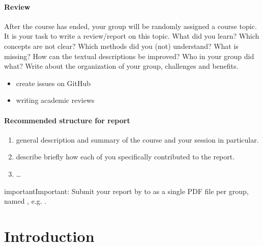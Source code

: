 \documentclass[letterpaper,10pt,english]{sphinxmanual}
\begin{document}
\subsubsection*{Review}

After the course has ended, your group will be randomly assigned a course topic.
It is your task to write a review/report on this topic.
What did you learn? Which concepts are not clear? Which methods did you (not) understand?
What is missing? How can the textual descriptions be improved? Who in your group did what?
Write about the organization of your group, challenges and benefits.
\begin{itemize}
\item {} 
create issues on GitHub

\item {} 
writing academic reviews

\end{itemize}
\subsubsection*{Recommended structure for report}
\begin{enumerate}
%
\item {} 
 general description and summary of the course and your session in particular.

\item {} 
 describe briefly how each of you specifically contributed to the report.

\item {} 
…

\end{enumerate}

\begin{sphinxadmonition}{important}{Important:}
Submit your report by  to 
as a single PDF file per group, named , e.g. .
\end{sphinxadmonition}


\chapter{Introduction}
\label{\detokenize{2_introduction:introduction}}\label{\detokenize{2_introduction::doc}}
\end{document}
